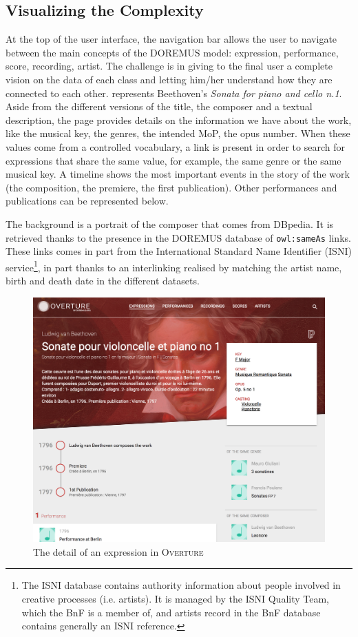 \subsection{Visualizing the Complexity}
At the top of the user interface, the navigation bar allows the user to navigate between the main concepts of the DOREMUS model: expression, performance, score, recording, artist. The challenge is in giving to the final user a complete vision on the data of each class and letting him/her understand how they are connected to each other.  represents Beethoven's \textit{Sonata for piano and cello n.1}. Aside from the different versions of the title, the composer and a textual description, the page provides details on the information we have about the work, like the musical key, the genres, the intended MoP, the opus number. When these values come from a controlled vocabulary, a link is present in order to search for expressions that share the same value, for example, the same genre or the same musical key. A timeline shows the most important events in the story of the work (the composition, the premiere, the first publication). Other performances and publications can be represented below. 

The background is a portrait of the composer that comes from DBpedia. It is retrieved thanks to the presence in the DOREMUS database of \texttt{owl:sameAs} links. These links comes in part from the International Standard Name Identifier (ISNI) service\footnote{The ISNI database contains authority information about people involved in creative processes (i.e. artists). It is managed by the ISNI Quality Team, which the BnF is a member of, and artists record in the BnF database contains generally an ISNI reference.}, in part thanks to an interlinking realised by matching the artist name, birth and death date in the different datasets.

\begin{figure}
 \centerline{
 \includegraphics[width=\columnwidth]{figs/Overture_sonata.png}}
 \caption{The detail of an expression in \textsc{Overture}}
 \label{fig:overture-detail}
\end{figure}

